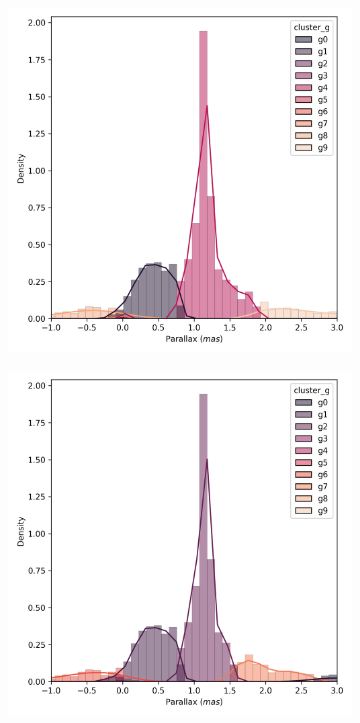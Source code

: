 \documentclass[11pt,a4paper,english,twocolumn]{article}
\begin{document}
\begin{figure}[!hbt]
  \begin{subfigure}{0.3\textwidth}
    \includegraphics[width=\textwidth]{../figures/ngc_2682/kmeans_parallax_ngc_2682.png}
  \end{subfigure}
  \begin{subfigure}{0.3\textwidth}
    \includegraphics[width=\textwidth]{../figures/ngc_2682/dec_parallax_ngc_2682.png}

\end{subfigure}
\end{figure}
\end{document}
